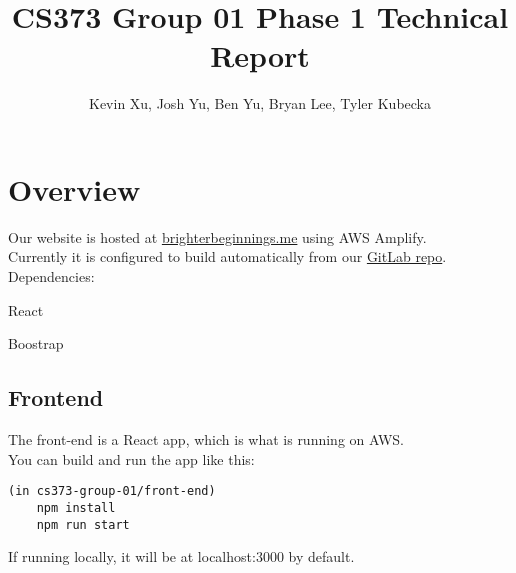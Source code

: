 \documentclass[12pt]{article}
\title{CS373 Group 01 Phase 1 Technical Report}
\author{Kevin Xu, Josh Yu, Ben Yu, Bryan Lee, Tyler Kubecka}
\begin{document}
\maketitle

\section*{Overview}

Our website is hosted at \href{https://brighterbeginnings.me}{brighterbeginnings.me} using AWS Amplify.
\\
Currently it is configured to build automatically from our \href{https://gitlab.com/kxut/cs373-group-01/}{GitLab repo}.
\\
Dependencies:

React

Boostrap
\subsection*{Frontend}
The front-end is a React app, which is what is running on AWS.
\\ You can build and run the app like this:
\begin{verbatim}
(in cs373-group-01/front-end)
    npm install
    npm run start
\end{verbatim}
If running locally, it will be at localhost:3000 by default.
\end{document}
